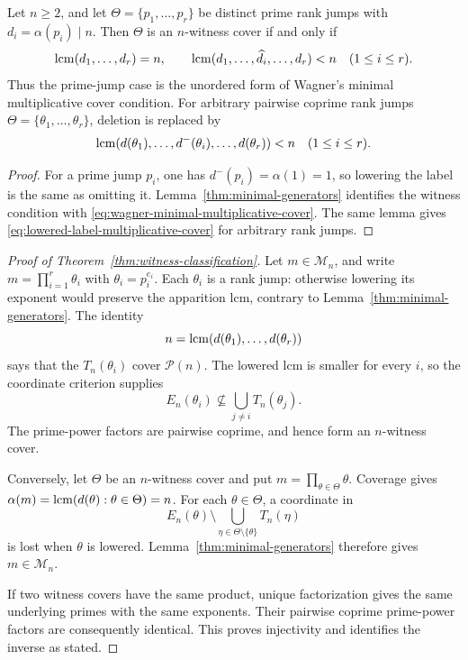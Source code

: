 \begin{proposition}\label{prop:wagner-comparison}
Let $n\geq2$, and let $\Theta=\{p_1,\ldots,p_r\}$ be distinct prime rank
jumps with $d_i=\alpha(p_i)\mid n$.  Then $\Theta$ is an $n$-witness cover
if and only if
\begin{equation}\label{eq:wagner-minimal-multiplicative-cover}
 \operatorname{lcm}(d_1,\ldots,d_r)=n,\qquad
 \operatorname{lcm}(d_1,\ldots,\widehat{d_i},\ldots,d_r)<n
 \quad(1\leq i\leq r).
\end{equation}
Thus the prime-jump case is the unordered form of Wagner's minimal
multiplicative cover condition.  For arbitrary pairwise coprime rank jumps
$\Theta=\{\theta_1,\ldots,\theta_r\}$, deletion is replaced by
\begin{equation}\label{eq:lowered-label-multiplicative-cover}
 \operatorname{lcm}(d(\theta_1),\ldots,d^-(\theta_i),\ldots,d(\theta_r))<n
 \quad(1\leq i\leq r).
\end{equation}
\end{proposition}

\begin{proof}
For a prime jump $p_i$, one has $d^-(p_i)=\alpha(1)=1$, so lowering the
label is the same as omitting it.  Lemma~\ref{thm:minimal-generators}
identifies the witness condition with
\eqref{eq:wagner-minimal-multiplicative-cover}.  The same lemma gives
\eqref{eq:lowered-label-multiplicative-cover} for arbitrary rank jumps.
\end{proof}

\begin{proof}[Proof of Theorem~\ref{thm:witness-classification}]
Let $m\in\mathcal M_n$, and write
$m=\prod_{i=1}^r\theta_i$ with
$\theta_i=p_i^{e_i}$.  Each $\theta_i$ is a rank jump: otherwise lowering
its exponent would preserve the apparition lcm, contrary to
Lemma~\ref{thm:minimal-generators}.  The identity
\[
 n=\operatorname{lcm}(d(\theta_1),\ldots,d(\theta_r))
\]
says that the $T_n(\theta_i)$ cover $\mathcal P(n)$.  The lowered lcm is
smaller for every $i$, so the coordinate criterion supplies
\[
 E_n(\theta_i)\nsubseteq\bigcup_{j\ne i}T_n(\theta_j).
\]
The prime-power factors are pairwise coprime, and hence form an
$n$-witness cover.

Conversely, let $\Theta$ be an $n$-witness cover and put
$m=\prod_{\theta\in\Theta}\theta$.  Coverage gives
$\alpha(m)=\operatorname{lcm}(d(\theta):\theta\in\Theta)=n$.  For each
$\theta\in\Theta$, a coordinate in
\[
 E_n(\theta)\setminus
 \bigcup_{\eta\in\Theta\setminus\{\theta\}}T_n(\eta)
\]
is lost when $\theta$ is lowered.  Lemma~\ref{thm:minimal-generators}
therefore gives $m\in\mathcal M_n$.

If two witness covers have the same product, unique factorization gives the
same underlying primes with the same exponents.  Their pairwise coprime
prime-power factors are consequently identical.  This proves injectivity and
identifies the inverse as stated.
\end{proof}


